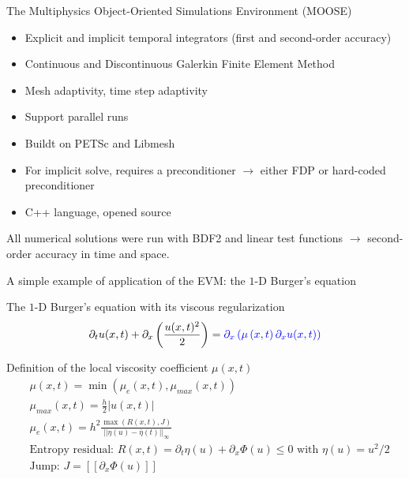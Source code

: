 \documentclass[xcolor=dvipsnames,10pt]{beamer}
\begin{document}
\begin{frame}{The Multiphysics Object-Oriented Simulations Environment (MOOSE)}
\begin{block}{}
\begin{itemize}
\setlength{\itemsep}{10pt}
\item Explicit and implicit temporal integrators (first and second-order accuracy)
\item Continuous and Discontinuous Galerkin Finite Element Method
\item Mesh adaptivity, time step adaptivity
\item Support parallel runs
\item Buildt on PETSc and Libmesh
\item For implicit solve, requires a preconditioner $\to$ either FDP or hard-coded preconditioner
\item C++ language, opened source
\end{itemize}
\end{block}
\begin{block}{}
All numerical solutions were run with BDF2 and linear test functions $\to$ second-order accuracy in time and space.
\end{block}
\end{frame}
\begin{frame}{A simple example of application of the EVM: the $1$-D Burger's equation}
\begin{block}{The $1$-D Burger's equation with its viscous regularization}
\begin{equation}
\partial_t u(x,t) + \partial_x \left( \frac{u(x,t)^2}{2} \right) = \textcolor{blue}{\partial_x \left( \mu \left(x,t \right) \partial_x u(x,t) \right)} \nonumber
\end{equation}
\end{block}
\begin{block}{Definition of the local viscosity coefficient $\mu(x,t)$}
\begin{align}
&\mu(x,t) = \min \left( \mu_e(x,t), \mu_{max}(x,t) \right) \nonumber \\
&\mu_{max} (x,t) = \frac{h}{2} | u(x,t) | \nonumber \\
&\mu_e(x,t) = h^2 \frac{\max \left( R(x,t), J \right)}{|| \eta(u) - \bar{\eta}(t) ||_\infty} \nonumber \\
& \text{Entropy residual: }R(x,t) = \partial_t \eta(u) + \partial_x \Phi(u) \leq 0 \text{ with } \eta(u) = u^2 / 2 \nonumber \\
&\text{Jump: } J = [[ \partial_x \Phi(u) ]] \nonumber
\end{align}
\end{block}
\end{frame}
\end{document}

